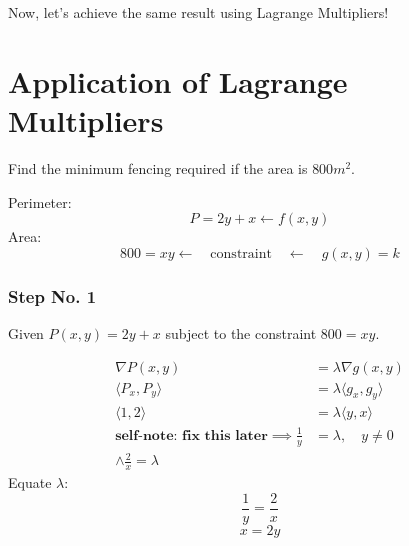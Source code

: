 \documentclass{article}
\begin{document}
Now, let's achieve the same result using Lagrange Multipliers!

\section*{Application of Lagrange Multipliers}

\begin{examplebox}
    Find the minimum fencing required if the area is \( 800 m^2 \).

    \begin{solutionbox}
        Perimeter:
        \[
            P = 2y + x \leftarrow f(x, y)
        \]
        Area:
        \[
            800 = xy \leftarrow \quad \text{constraint} \quad \leftarrow \quad g(x, y) = k
        \]
        \end{solutionbox}
    
        \subsubsection*{Step No. 1}
        Given \( P(x, y) = 2y + x \) subject to the constraint \( 800 = xy \).
    
        \begin{solutionbox}
        \begin{align*}
            \nabla P(x, y) &= \lambda \nabla g(x, y) \\
            \langle P_x, P_y \rangle &= \lambda \langle g_x, g_y \rangle \\
            \langle 1, 2 \rangle &= \lambda \langle y, x \rangle \\
            \textbf{self-note: fix this later}
            \implies \frac{1}{y} &= \lambda, \quad y \neq 0 \\
            \land \frac{2}{x} = \lambda
        \end{align*}
        Equate \( \lambda \):
        \[
            \frac{1}{y} = \frac{2}{x}
        \]
        \[
            x = 2y
        \]

\end{solutionbox}
\end{examplebox}
\end{document}
